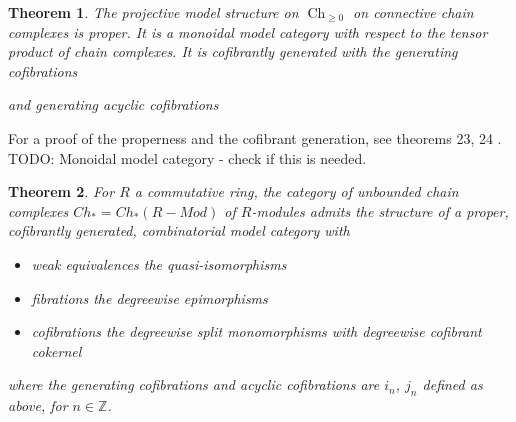 \documentclass{scrartcl}
\theoremstyle{plain}
\newtheorem{theorem}{Theorem}[section]
\theoremstyle{definition}
\newcommand{\Z}{\mathbb Z}
\DeclareMathOperator{\Ch}{Ch}
\begin{document}
\begin{theorem}
    The projective model structure on $\Ch_{\geq 0}$ on connective chain complexes is proper. It is a monoidal model category with respect to the tensor product of chain complexes. It is cofibrantly generated with the generating cofibrations

    \begin{center}
    \end{center}

  and generating acyclic cofibrations
    \begin{center}
    \end{center}
    \end{theorem}
For a proof of the properness and the cofibrant generation, see theorems 23, 24 \cite{strickland2020model}. TODO: Monoidal model category - check if this is needed.

\begin{theorem}
    For $R$ a commutative ring, the category of unbounded chain complexes $Ch_* = Ch_*(R-Mod)$ of $R$-modules admits the structure of a proper, cofibrantly generated, combinatorial model category with 
    \begin{itemize}
        \item weak equivalences the quasi-isomorphisms
        \item fibrations the degreewise epimorphisms
        \item cofibrations the degreewise split monomorphisms with degreewise cofibrant cokernel
    \end{itemize}
    where the generating cofibrations and acyclic cofibrations are $i_n$, $j_n$ defined as above, for $n\in\Z$.
\end{theorem}
\end{document}
